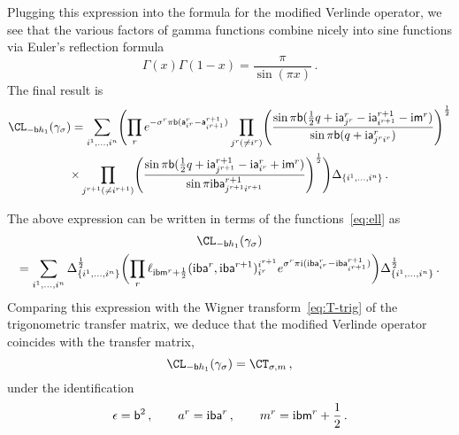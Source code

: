 Plugging this expression into the formula for the modified Verlinde
operator, we see that the various factors of gamma functions combine
nicely into sine functions via Euler's reflection formula
\begin{equation}
  \Gamma(x) \Gamma(1-x) = \frac{\pi}{\sin(\pi x)} \,.
\end{equation}
The final result is
\begin{multline}
  \CL_{-\bs h_1}(\gamma_\sigma)
  =
  \sum_{i^1, \dotsc, i^n}
  \Biggl(
  \prod_r
  e^{-\sigma^r \pi\bs(\as^r_{i^r} - \as^{r+1}_{i^{r+1}})}
  \prod_{j^r (\neq i^r)}
  \Biggl(
  \frac{\sin\pi\bs(\frac12 q + \iu \as^r_{j^r} - \iu \as^{r+1}_{i^{r+1}} - \iu \ms^r)}
       {\sin\pi\bs(q + \iu \as^r_{j^r i^r})}
  \Biggr)^{\frac12}
  \\
  \times
  \prod_{j^{r+1} (\neq i^{r+1})}
  \Biggl(
  \frac{\sin\pi\bs(\frac12 q + \iu \as^{r+1}_{j^{r+1}} - \iu \as^r_{i^r} + \iu \ms^r)}
       {\sin\pi \iu\bs \as^{r+1}_{j^{r+1} i^{r+1}}}
  \Biggr)^{\frac12}
  \Biggr)
  \Delta_{\{i^1,\dotsc,i^n\}} \,.
\end{multline}

The above expression can be written in terms of the
functions~\eqref{eq:ell} as
\begin{multline}
  \CL_{-\bs h_1}(\gamma_\sigma)
  \\
  =
  \sum_{i^1, \dotsc, i^n}
  \Delta_{\{i^1,\dotsc,i^n\}}^{\frac12}
  \biggl(
  \prod_r
  \ell_{\iu\bs \ms^r + \frac12}(\iu\bs \as^r, \iu\bs \as^{r+1})_{i^r}^{i^{r+1}}
  e^{\sigma^r \pi\iu(\iu\bs \as^r_{i^r} - \iu\bs \as^{r+1}_{i^{r+1}})}
  \biggr)
  \Delta_{\{i^1,\dotsc,i^n\}}^{\frac12} \,.
\end{multline}
Comparing this expression with the Wigner transform~\eqref{eq:T-trig}
of the trigonometric transfer matrix, we deduce that the modified
Verlinde operator coincides with the transfer matrix,
\begin{equation}
  \CL_{-\bs h_1}(\gamma_\sigma) = \CT_{\sigma,m} \,,
\end{equation}
under the identification
\begin{equation}
  \epsilon = \mathsf{b}^2 \,,
  \qquad
  a^r= \mathrm{i}\mathsf{b}\mathsf{a}^r \,,
  \qquad
  m^r = \mathrm{i}\mathsf{b}\mathsf{m}^r + \frac12 \,.
\end{equation}

